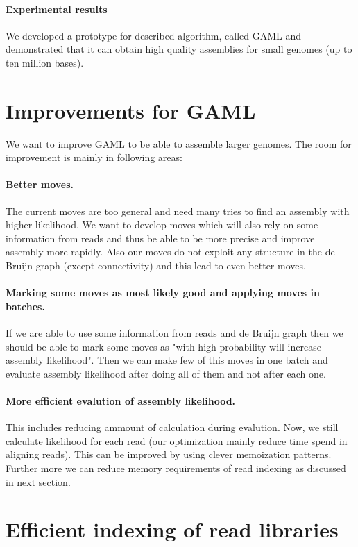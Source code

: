 \paragraph{Experimental results}
We developed a prototype for described algorithm, called GAML and
demonstrated that it can obtain high quality assemblies
for small genomes (up to ten million bases).

\section{Improvements for GAML}

We want to improve GAML to be able to assemble larger genomes.
The room for improvement is mainly in following areas:

\paragraph{Better moves.}
The current moves are too general and need many tries to
find an assembly with higher likelihood. We want to develop
moves which will also rely on some information from reads
and thus be able to be more precise and improve
assembly more rapidly. Also our moves
do not exploit any structure in the de Bruijn graph (except connectivity)
and this lead to even better moves.

\paragraph{Marking some moves as most likely good and applying moves in batches.}
If we are able to use some information from reads and de Bruijn graph
then we should be able to mark some moves as "with high probability will increase
assembly likelihood". Then we can make few of this moves in one
batch and evaluate assembly likelihood after doing all of them
and not after each one.

\paragraph{More efficient evalution of assembly likelihood.}
This includes reducing ammount of calculation during evalution.
Now, we still calculate likelihood for each read (our optimization
mainly reduce time spend in aligning reads). This can
be improved by using clever memoization patterns.
Further more we can reduce memory requirements
of read indexing as discussed in next section.

\section{Efficient indexing of read libraries}

